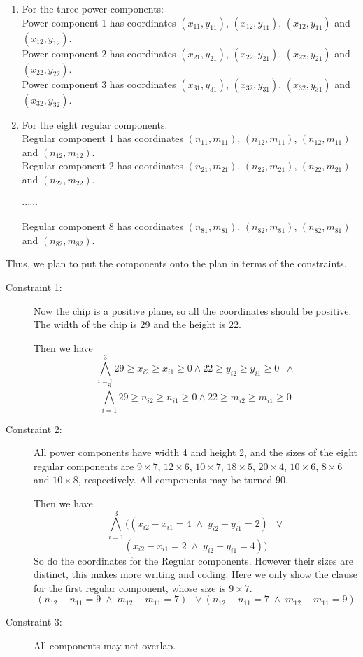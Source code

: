 \documentclass[11pt]{article}
\begin{document}
{\begin{enumerate}
  \item For the three power components:\\
  Power component 1 has coordinates $(x_{11}, y_{11})$, $(x_{12}, y_{11})$, $(x_{12}, y_{11})$ and $(x_{12}, y_{12})$.\\
  Power component 2 has coordinates $(x_{21}, y_{21})$, $(x_{22}, y_{21})$, $(x_{22}, y_{21})$ and $(x_{22}, y_{22})$.\\
  Power component 3 has coordinates $(x_{31}, y_{31})$, $(x_{32}, y_{31})$, $(x_{32}, y_{31})$ and $(x_{32}, y_{32})$.
  \item For the eight regular components:\\
  Regular component 1 has coordinates $(n_{11}, m_{11})$, $(n_{12}, m_{11})$, $(n_{12}, m_{11})$ and $(n_{12}, m_{12})$.\\
  Regular component 2 has coordinates $(n_{21}, m_{21})$, $(n_{22}, m_{21})$, $(n_{22}, m_{21})$ and $(n_{22}, m_{22})$.

  $\cdots \cdots$

  Regular component 8 has coordinates $(n_{81}, m_{81})$, $(n_{82}, m_{81})$, $(n_{82}, m_{81})$ and $(n_{82}, m_{82})$.
\end{enumerate}
Thus, we plan to put the components onto the plan in terms of the constraints.

\begin{description}
  \item[Constraint 1:] Now the chip is a positive plane, so all the coordinates should be positive. The width of the chip is 29 and the height is 22.

  Then we have
  \[  \bigwedge_{i=1}^3 29 \geq x_{i2} \geq x_{i1} \geq 0 \wedge 22 \geq y_{i2} \geq y_{i1} \geq 0 \;\; \wedge \]
  \[  \bigwedge_{i=1}^8 29 \geq n_{i2} \geq n_{i1} \geq 0 \wedge 22 \geq m_{i2} \geq m_{i1} \geq 0 \]
  \item[Constraint 2:] All power components have width 4 and height 2,
  and the sizes of the eight regular components are $9 \times 7$, $12 \times 6$, $10 \times 7$, $18 \times 5$, $20 \times 4$, $10 \times 6$, $8 \times 6$ and $10 \times 8$, respectively.
  All components may be turned 90.

  Then we have
  \[  \bigwedge_{i=1}^3 ((x_{i2} - x_{i1} = 4 \; \wedge \; y_{i2} - y_{i1} = 2) \;\; \vee \]
  \[ (x_{i2} - x_{i1} = 2 \; \wedge \; y_{i2} - y_{i1} = 4)) \]
  So do the coordinates for the Regular components. However their sizes are distinct,
  this makes more writing and coding. Here we only show the clause for the first regular component,
  whose size is $9 \times 7$. \\
  \[ (n_{12} - n_{11} = 9 \; \wedge \; m_{12} - m_{11} = 7) \;\; \vee (n_{12} - n_{11} = 7 \; \wedge \; m_{12} - m_{11} = 9) \]
  \item[Constraint 3:] All components may not overlap.


\end{description}}
\end{document}
